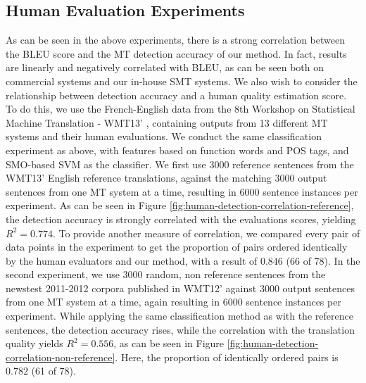 \documentclass[11pt]{article}
\begin{document}
\subsection{Human Evaluation Experiments}
As can be seen in the above experiments, there is a strong correlation between the BLEU score and the MT detection accuracy of our method. In fact, results are linearly and negatively correlated with BLEU, as can be seen both on commercial systems and our in-house SMT systems. We also wish to consider the relationship between detection accuracy and a human quality estimation score. To do this, we use the French-English data from the 8th Workshop on Statistical Machine Translation - WMT13' \cite{bojar-EtAl:2013:WMT}, containing outputs from 13 different MT systems and their human evaluations. We conduct the same classification experiment as above, with features based on function words and POS tags, and SMO-based SVM as the classifier. We first use 3000 reference sentences from the WMT13' English reference translations, against the matching 3000 output sentences from one MT system at a time, resulting in 6000 sentence instances per experiment. As can be seen in Figure \ref{fig:human-detection-correlation-reference}, the detection accuracy is strongly correlated with the evaluations scores, yielding $R^2 = 0.774$. To provide another measure of correlation, we compared every pair of data points in the experiment to get the proportion of pairs ordered identically by the human evaluators and our method, with a result of $0.846$ (66  of 78). In the second experiment, we use 3000 random, non reference sentences from the newstest 2011-2012 corpora published in WMT12' \cite{callisonburch-EtAl:2012:WMT} against 3000 output sentences from one MT system at a time, again resulting in 6000 sentence instances per experiment. While applying the same classification method as with the reference sentences, the detection accuracy rises, while the correlation with the translation quality yields $R^2 = 0.556$, as can be seen in Figure \ref{fig:human-detection-correlation-non-reference}. Here, the proportion of identically ordered pairs is $0.782$ (61 of 78). 
\end{document}
